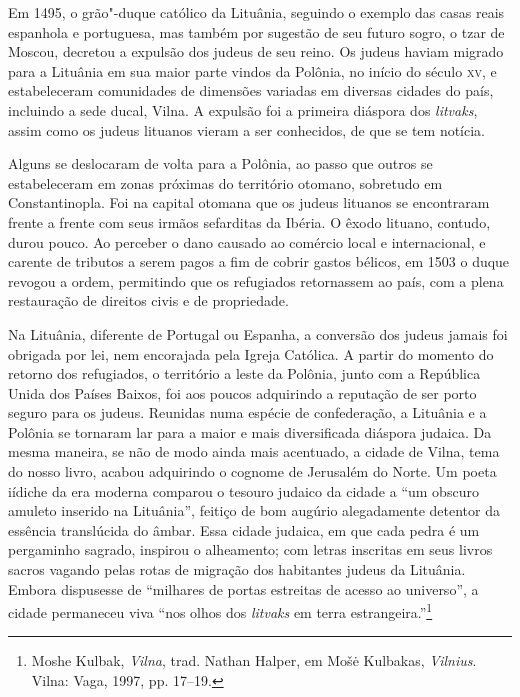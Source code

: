 Em 1495, o grão"-duque católico da Lituânia, seguindo o exemplo das casas
reais espanhola e portuguesa, mas também por sugestão de seu futuro
sogro, o tzar de Moscou, decretou a expulsão dos judeus de seu reino. Os
judeus haviam migrado para a Lituânia em sua maior parte vindos da
Polônia, no início do século \textsc{xv}, e estabeleceram comunidades de
dimensões variadas em diversas cidades do país, incluindo a sede ducal,
Vilna. A expulsão foi a primeira diáspora dos \textit{litvaks}, assim como os
judeus lituanos vieram a ser conhecidos, de que se tem notícia. 

Alguns
se deslocaram de volta para a Polônia, ao passo que outros se
estabeleceram em zonas próximas do território otomano, sobretudo em
Constantinopla. Foi na capital otomana que os judeus lituanos se
encontraram frente a frente com seus irmãos sefarditas da Ibéria. O
êxodo lituano, contudo, durou pouco. Ao perceber o dano causado ao
comércio local e internacional, e carente de tributos a serem pagos a
fim de cobrir gastos bélicos, em 1503 o duque revogou a ordem,
permitindo que os refugiados retornassem ao país, com a plena
restauração de direitos civis e de propriedade. 

Na Lituânia, diferente
de Portugal ou Espanha, a conversão dos judeus jamais foi obrigada por
lei, nem encorajada pela Igreja Católica. A partir do momento do retorno
dos refugiados, o território a leste da Polônia, junto com a República
Unida dos Países Baixos, foi aos poucos adquirindo a reputação de ser
porto seguro para os judeus. Reunidas numa espécie de confederação, a
Lituânia e a Polônia se tornaram lar para a maior e mais diversificada
diáspora judaica. Da mesma maneira, se não de modo ainda mais acentuado,
a cidade de Vilna, tema do nosso livro, acabou adquirindo o cognome de
Jerusalém do Norte. Um poeta iídiche da era moderna comparou o tesouro
judaico da cidade a ``um obscuro amuleto inserido na Lituânia'', feitiço
de bom augúrio alegadamente detentor da essência translúcida do âmbar.
Essa cidade judaica, em que cada pedra é um pergaminho sagrado, inspirou
o alheamento; com letras inscritas em seus livros sacros vagando pelas
rotas de migração dos habitantes judeus da Lituânia. Embora dispusesse
de ``milhares de portas estreitas de acesso ao universo'', a cidade
permaneceu viva ``nos olhos dos \textit{litvaks} em terra
estrangeira.''\footnote{Moshe Kulbak, \textit{Vilna}, trad. Nathan
  Halper, em Mošė Kulbakas, \textit{Vilnius}. Vilna: Vaga, 1997, pp.
  17--19.}

